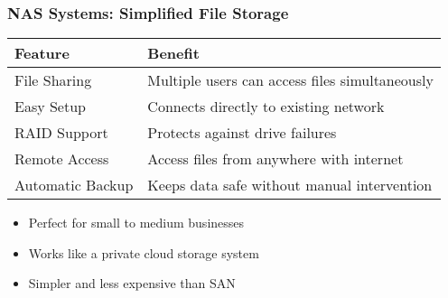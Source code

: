 \documentclass{beamer}
\begin{document}
\begin{frame}
    \frametitle{NAS Systems: Simplified File Storage}
    
    \begin{tabular}{|p{}|p{}|}
        \hline
        \textbf{Feature} & \textbf{Benefit} \\
        \hline
        File Sharing & Multiple users can access files simultaneously \\
        \hline
        Easy Setup & Connects directly to existing network \\
        \hline
        RAID Support & Protects against drive failures \\
        \hline
        Remote Access & Access files from anywhere with internet \\
        \hline
        Automatic Backup & Keeps data safe without manual intervention \\
        \hline
    \end{tabular}
    
    \begin{itemize}
        \item Perfect for small to medium businesses
        \item Works like a private cloud storage system
        \item Simpler and less expensive than SAN
    \end{itemize}
\end{frame}
\end{document}
